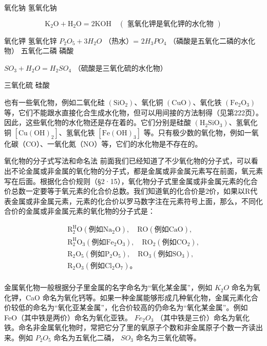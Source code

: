 氧化钠 氢氧化钠

\[
\mathrm{K}_{2} \mathrm{O} + \mathrm{H}_{2} \mathrm{O} = 2 \mathrm{KOH} \quad (\text{ 氢氧化钾是氧化钾的水化物 })
\]

氧化钾 氢氧化锌 \(P_{2}O_{5}+3H_{2}O\) （热水）= \(2H_{3}PO_{4}\)
（磷酸是五氧化二磷的水化物） 五氧化二磷 磷酸

\(SO_{3} + H_{2}O = H_{2}SO_{4}\) （硫酸是三氧化硫的水化物）

三氧化硫 硅酸

也有一些氧化物，例如二氧化硅 \(\left(\mathrm{SiO}_{2}\right)\)、氧化铜
\(\left(\mathrm{CuO}\right)\)、氧化铁
\(\left(\mathrm{Fe}_{2}\mathrm{O}_{3}\right)\)
等，它们不能跟水直接化合生成水化物，但可以用间接的方法制得（见第222页）。因此，这些氧化物的水化物还是存在着的。它们分别是硅酸
\(\left(\mathrm{H}_{2}\mathrm{SiO}_{3}\right)\)、氢氧化铜
\(\left[\mathrm{Cu(OH)}_{2}\right]\)、氢氧化铁
\(\left[\mathrm{Fe(OH)}_{3}\right]\)
等。只有极少数的氧化物，例如一氧化碳（CO）、一氧化氮（NO）等，它们的水化物是不存在的。

氧化物的分子式写法和命名法
前面我们已经知道了不少氧化物的分子式，可以看出不论金属或非金属的氧化物的分子式，都是金属或非金属元素写在前面，氧元素写在后面。根据化合价规则（§2·15），氧化物分子式里金属或非金属元素的化合价总数一定要等于氧元素的化合价总数。我们知道氧的化合价是2价，如果以R代表金属或非金属元素，元素的化合价以罗马数字注在元素符号上面，那么，不同化合价的金属或非金属元素的氧化物的分子式是：

\[
\begin{array}{l} \mathrm{R}_{2}^{\mathrm{H}} \mathrm{O} (\text{例如} \mathrm{Na}_{2} \mathrm{O}), \quad \mathrm{RO} (\text{例如} \mathrm{CaO}), \\ \mathrm{R}_{2}^{\mathrm{H}} \mathrm{O}_{3} (\text{例如} \mathrm{Fe}_{2} \mathrm{O}_{3}), \quad \mathrm{RO}_{2} (\text{例如} \mathrm{CO}_{2}), \\ \mathrm{R}_{2} \mathrm{O}_{5} (\text{例如} \mathrm{P}_{2} \mathrm{O}_{5}), \quad \mathrm{RO}_{3} (\text{例如} \mathrm{SO}_{3}), \\ \mathrm{R}_{2} \mathrm{O}_{3} (\text{例如} \mathrm{Cl}_{2} \mathrm{O}_{7})\text{。} \\ \end{array}
\]

金属氧化物一般根据分子里金属的名字命名为``氧化某金属''，例如 \(K_{2}O\)
命名为氧化钾，CaO
命名为氧化钙等。如果一种金属能够形成几种氧化物，金属元素化合价较低的命名为``氧化亚某金属''，化合价较高的仍命名为``氧化某金属''。例如
FeO（其中铁是两价）命名为氧化亚铁。 \(Fe_{2}O_{3}\)
（其中铁是三价）命名为氧化铁。命名非金属氧化物时，常把它分了里的氧原子个数和非金属原子个数一齐读出来。例如
\(P_{2}O_{5}\) 命名为五氧化二磷， \(SO_{3}\) 命名为三氧化硫等。

